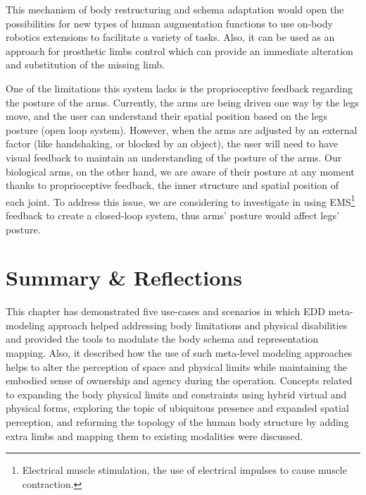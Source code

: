 This mechanism of body restructuring and schema adaptation would open the possibilities for new types of human augmentation functions to use on-body robotics extensions to facilitate a variety of tasks. Also, it can be used as an approach for prosthetic limbs control which can provide an immediate alteration and substitution of the missing limb.

One of the limitations this system lacks is the proprioceptive feedback regarding the posture of the arms. Currently, the arms are being driven one way by the legs move, and the user can understand their spatial position based on the legs posture (open loop system). However, when the arms are adjusted by an external factor (like handshaking, or blocked by an object), the user will need to have visual feedback to maintain an understanding of the posture of the arms. Our biological arms, on the other hand, we are aware of their posture at any moment thanks to proprioceptive feedback, the inner structure and spatial position of each joint. To address this issue, we are considering to investigate in using EMS\footnote{Electrical muscle stimulation, the use of electrical impulses to cause muscle contraction.} feedback to create a closed-loop system, thus arms' posture would affect legs' posture. 




\section{Summary \& Reflections}

This chapter has demonstrated five use-cases and scenarios in which EDD meta-modeling approach helped addressing body limitations and physical disabilities and provided the tools to modulate the body schema and representation mapping. Also, it described how the use of such meta-level modeling approaches helps to alter the perception of space and physical limits while maintaining the embodied sense of ownership and agency during the operation.  Concepts related to expanding the body physical limits and constraints using hybrid virtual and physical forms, exploring the topic of ubiquitous presence and expanded spatial perception, and reforming the topology of the human body structure by adding extra limbs and mapping them to existing modalities were discussed. 


